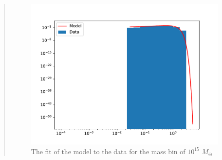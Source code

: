 \begin{quote}
\begin{figure}[!ht]
\centering
\includegraphics[scale=0.7]{plots/satgals_m15.pdf}
\caption{The fit of the model to the data for the mass bin of $10^15$ $M_{\oplus}$}
\end{figure}
\end{quote}



















